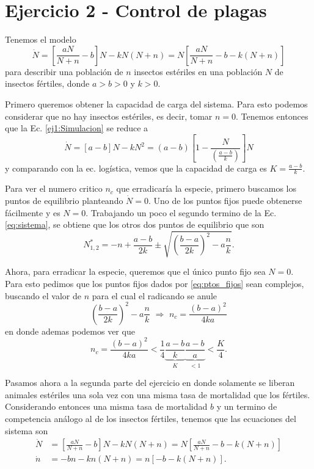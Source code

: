 \section*{Ejercicio 2 - Control de plagas}

Tenemos el modelo
\begin{equation}
    \dot{N} = \left[\frac{aN}{N+n} - b\right]N - kN\left(N+n\right) = N \left[ \frac{aN}{N+n} - b - k\left(N+n\right)\right]
    \label{eq:sistema}
\end{equation}
para describir una población de $n$ insectos estériles en una población $N$ de insectos fértiles, donde $a>b>0$ y $k>0$.

Primero queremos obtener la capacidad de carga del sistema. Para esto podemos considerar que no hay insectos estériles, es decir, tomar $n=0$. Tenemos entonces que la Ec. \ref{ej1:Simulacion} se reduce a
\begin{equation}
    \dot{N} = \left[a-b\right] N - k N^2 = \left(a-b\right) \left[1- \frac{N}{\left(\frac{a-b}{k}\right)}\right]N
\end{equation}
y comparando con la ec. logística, vemos que la capacidad de carga es $K = \frac{a-b}{k}$.

Para ver el numero critico $n_c$ que erradicaría la especie, primero buscamos los puntos de equilibrio planteando $\dot{N}=0$. Uno de los puntos fijos puede obtenerse fácilmente y es $N=0$. Trabajando un poco el segundo termino de la Ec. \ref{eq:sistema}, se obtiene que los otros dos puntos de equilibrio que son
\begin{equation}
    N_{1,2}^{*} = -n + \frac{a-b}{2k} \pm \sqrt{\left(\frac{b-a}{2k}\right)^{2} - a\frac{n}{k}}.
    \label{eq:ptos_fijos}
\end{equation}

Ahora, para erradicar la especie, queremos que el único punto fijo sea $N=0$. Para esto pedimos que los puntos fijos dados por \ref{eq:ptos_fijos} sean complejos, buscando el valor de $n$ para el cual el radicando se anule
\begin{equation}
    \left(\frac{b-a}{2k}\right)^{2} - a\frac{n}{k}\,\,\Rightarrow\,\,n_c = \frac{\left(b-a\right)^2}{4ka}
\end{equation}
en donde ademas podemos ver que
\begin{equation}
    n_c = \frac{\left(b-a\right)^2}{4ka} < \frac{1}{4} \underbrace{\frac{a-b}{k}}_{K} \underbrace{\frac{a-b}{a}}_{<1} < \frac{K}{4}.
\end{equation}

Pasamos ahora a la segunda parte del ejercicio en donde solamente se liberan animales estériles una sola vez con una misma tasa de mortalidad que los fértiles. Considerando entonces una misma tasa de mortalidad $b$ y un termino de competencia análogo al de los insectos fértiles, tenemos que las ecuaciones del sistema son
\begin{align}
    \dot{N} &= \left[\frac{aN}{N+n} - b\right]N - kN\left(N+n\right) = N \left[ \frac{aN}{N+n} - b - k\left(N+n\right)\right]\\[5pt]
    \dot{n} &= -bn - kn\left(N+n\right) = n \left[-b-k\left(N+n\right)\right].
\end{align}

